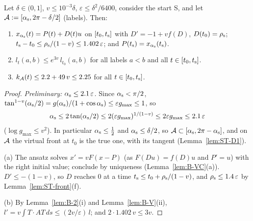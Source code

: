 \begin{lemma}[Connector]\label{lem:ST-D3}
Let $\delta\in(0,1]$, $v\le10^{-3}\delta$, $\varepsilon\le\delta^2/6400$, consider the start S, and let
$\mathcal A:=[\alpha_{\mathrm s},2\pi-\delta/2]$ (labels). Then:
\begin{enumerate}
\item[(a)] $x_{\alpha_{\mathrm s}}(t)=P(t)+D(t)u$ on $[t_0,t_{\mathrm s}]$ with $D'=-1+vf(D)$, $D(t_0)=\rho_{\mathrm s}$;
$t_{\mathrm s}-t_0\le\rho_{\mathrm s}/(1-v)\le1.402\,\varepsilon$; and $P(t_{\mathrm s})=x_{\alpha_{\mathrm s}}(t_{\mathrm s})$.
\item[(b)] $l_t(a,b)\le e^{3v}\,l_{t_0}(a,b)$ for all labels $a<b$ and all $t\in[t_0,t_{\mathrm s}]$.
\item[(c)] $k_{\mathcal A}(t)\le2.2+49\,v\le2.25$ for all $t\in[t_0,t_{\mathrm s}]$.
\end{enumerate}
\end{lemma}
\begin{proof}
\emph{Preliminary: $\alpha_{\mathrm s}\le2.1\,\varepsilon$.} Since $\alpha_{\mathrm s}<\pi/2$,
$\tan^{1-v}(\alpha_{\mathrm s}/2)=g(\alpha_{\mathrm s})/(1+\cos\alpha_{\mathrm s})\le\varepsilon g_{\max}\le1$, so
\begin{equation}\label{eq:ST-as}
\alpha_{\mathrm s}\le2\tan(\alpha_{\mathrm s}/2)\le2(\varepsilon g_{\max})^{1/(1-v)}\le2\varepsilon g_{\max}\le2.1\,\varepsilon
\end{equation}
($\log g_{\max}\le v^2$). In particular $\alpha_{\mathrm s}\le\frac12$ and $\alpha_{\mathrm s}\le\delta/2$, so $\mathcal A\subset[\alpha_{\mathrm s},2\pi-\alpha_{\mathrm s}]$, and on
$\mathcal A$ the virtual front at $t_0$ is the true one, with its tangent (Lemma~\ref{lem:ST-D1}).

(a) The ansatz solves $x'=vF(x-P)$ (as $F(Du)=f(D)u$ and $P'=u$) with the right initial value; conclude by uniqueness
(Lemma~\ref{lem:B-VC}(a)). $D'\le-(1-v)$, so $D$ reaches $0$ at a time $t_{\mathrm s}\le t_0+\rho_{\mathrm s}/(1-v)$, and $\rho_{\mathrm s}\le1.4\,\varepsilon$ by
Lemma~\ref{lem:ST-front}(f).

(b) By Lemma~\ref{lem:B-2}(i) and Lemma~\ref{lem:B-V}(ii), $l'=v\int T\cdot AT\,ds\le(2v/\varepsilon)\,l$; and
$2\cdot1.402\,v\le3v$.


\end{proof}
